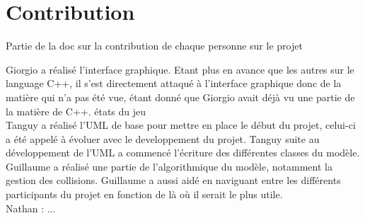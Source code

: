 \section{Contribution}
Partie de la doc sur la contribution de chaque personne sur le projet

Giorgio a réalisé l'interface graphique. Etant plus en avance que les autres sur le language C++, il s'est directement attaqué à l'interface graphique donc de la matière qui n'a pas été vue, étant donné que Giorgio avait déjà vu une partie de la matière de C++. états du jeu
\\

Tanguy a réalisé  l'UML de base pour mettre en place le début du projet, celui-ci a été appelé à évoluer avec le developpement du projet. Tanguy suite au développement de l'UML a commencé l'écriture des différentes classes du modèle.\\

Guillaume a réalisé une partie de l'algorithmique du modèle, notamment la gestion des collisions. Guillaume a aussi aidé en naviguant entre les différents participants du projet en fonction de là où il serait le plus utile.\\

Nathan : ...